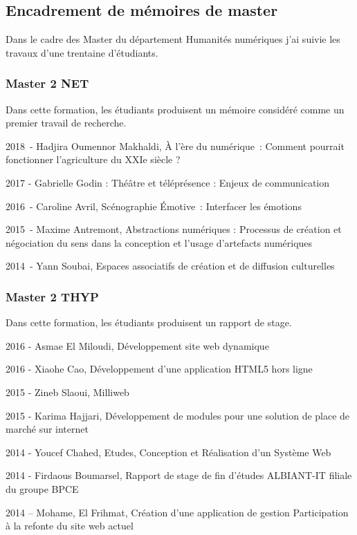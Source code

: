 \documentclass[
  a4paper,
  DIV=11,
  numbers=noendperiod]{scrreprt}
\begin{document}
\subsection{Encadrement de mémoires de
master}\label{encadrement-de-muxe9moires-de-master}

Dans le cadre des Master du département Humanités numériques j'ai suivie
les travaux d'une trentaine d'étudiants.

\subsubsection{Master 2 NET}\label{master-2-net}

Dans cette formation, les étudiants produisent un mémoire considéré
comme un premier travail de recherche.

2018~- Hadjira Oumennor Makhaldi, À l'ère du numérique~: Comment
pourrait fonctionner l'agriculture du XXIe siècle ?~

2017 - Gabrielle Godin : Théâtre et téléprésence : Enjeux de
communication

2016~- Caroline Avril, Scénographie Émotive~: Interfacer les émotions

2015~- Maxime Antremont, Abstractions numériques : Processus de création
et négociation du sens dans la conception et l'usage d'artefacts
numériques

2014~- Yann Soubai, Espaces associatifs de création et de diffusion
culturelles

\subsubsection{Master 2 THYP}\label{master-2-thyp}

Dans cette formation, les étudiants produisent un rapport de stage.

2016 - Asmae El Miloudi, Développement site web dynamique

2016 - Xiaohe Cao, Développement d'une application HTML5 hors ligne

2015 - Zineb Slaoui, Milliweb

2015 - Karima Hajjari, Développement de modules pour une solution de
place de marché sur internet

2014 - Youcef Chahed, Etudes, Conception et Réalisation d'un Système
Web~

2014 - Firdaous Boumarsel, Rapport de stage de fin d'études ALBIANT-IT
filiale du groupe BPCE

2014 -- Mohame, El Frihmat, Création d'une application de gestion
Participation à la refonte du site web actuel
\end{document}
